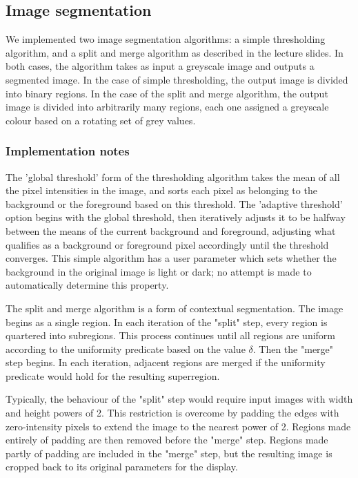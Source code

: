 \subsection{Image segmentation}
\label{sec:segmentation}

We implemented two image segmentation algorithms: a simple thresholding algorithm, and a split and merge algorithm as described in the lecture slides. In both cases, the algorithm takes as input a greyscale image and outputs a segmented image. In the case of simple thresholding, the output image is divided into binary regions. In the case of the split and merge algorithm, the output image is divided into arbitrarily many regions, each one assigned a greyscale colour based on a rotating set of grey values.

\subsubsection{Implementation notes}

The 'global threshold' form of the thresholding algorithm takes the mean of all the pixel intensities in the image, and sorts each pixel as belonging to the background or the foreground based on this threshold. The 'adaptive threshold' option begins with the global threshold, then iteratively adjusts it to be halfway between the means of the current background and foreground, adjusting what qualifies as a background or foreground pixel accordingly until the threshold converges. This simple algorithm has a user parameter which sets whether the background in the original image is light or dark; no attempt is made to automatically determine this property.

The split and merge algorithm is a form of contextual segmentation. The image begins as a single region. In each iteration of the "split" step, every region is quartered into subregions. This process continues until all regions are uniform according to the uniformity predicate based on the value $\delta$. Then the "merge" step begins. In each iteration, adjacent regions are merged if the uniformity predicate would hold for the resulting superregion.

Typically, the behaviour of the "split" step would require input images with width and height powers of 2. This restriction is overcome by padding the edges with zero-intensity pixels to extend the image to the nearest power of 2. Regions made entirely of padding are then removed before the "merge" step. Regions made partly of padding are included in the "merge" step, but the resulting image is cropped back to its original parameters for the display.

